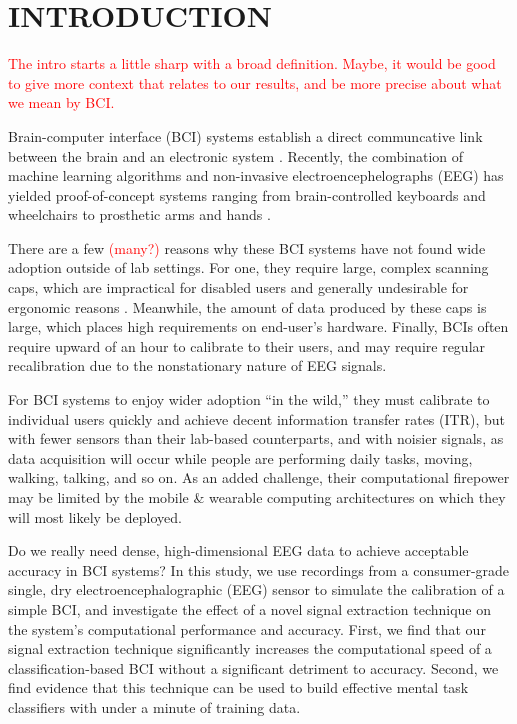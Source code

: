 \section{\uppercase{Introduction}}
\label{sec:introduction}

\textcolor{red}{The intro starts a little sharp with a broad definition. Maybe, it would be good to give more context that relates to our results, and be more precise about what we mean by BCI.}

\noindent Brain-computer interface (BCI) systems establish a direct communcative link between the brain and an electronic system \cite{dornhege_toward_2007,mcfarland_brain-computer_2011}.  Recently, the combination of machine learning algorithms and non-invasive electroencephelographs (EEG) has yielded proof-of-concept systems ranging from brain-controlled keyboards and wheelchairs to prosthetic arms and hands \cite{blankertz_note_2007,millan_combining_2010,d._mattia_brain_2011,hill_practical_2014,campbell_neurophone:_2010}. 

There are a few \textcolor{red}{(many?)} reasons why these BCI systems have not found wide adoption outside of lab settings. For one, they require large, complex scanning caps, which are impractical for disabled users and generally undesirable for ergonomic reasons \cite{ekandem_evaluating_2012,leeb_transferring_2013}. Meanwhile, the amount of data produced by these caps is large, which places high requirements on end-user's hardware. Finally, BCIs often require upward of an hour to calibrate to their users, and may require regular recalibration due to the nonstationary nature of EEG signals. \cite{vidaurre_fully_2006,vidaurre_co-adaptive_2011,blankertz_non-invasive_2007} 

For BCI systems to enjoy wider adoption ``in the wild,'' they must calibrate to individual users quickly and achieve decent information transfer rates (ITR), but with fewer sensors than their lab-based counterparts, and with noisier signals, as data acquisition will occur while people are performing daily tasks, moving, walking, talking, and so on. As an added challenge, their computational firepower may be limited by the mobile \& wearable computing architectures on which they will most likely be deployed. 

Do we really need dense, high-dimensional EEG data to achieve acceptable accuracy in BCI systems? In this study, we use recordings from a consumer-grade single, dry electroencephalographic (EEG) sensor to simulate the calibration of a simple BCI, and investigate the effect of a novel signal extraction technique on the system’s computational performance and accuracy. First, we find that our signal extraction technique significantly increases the computational speed of a classification-based BCI without a significant detriment to accuracy. Second, we find evidence that this technique can be used to build effective mental task classifiers with under a minute of training data.